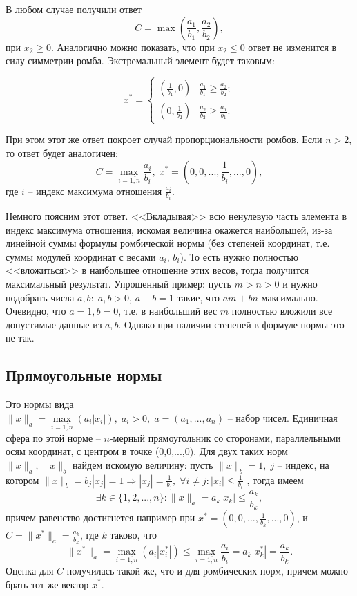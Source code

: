 \documentclass{article}
\begin{document}
В любом случае получили ответ
$$ C = \max\left(\frac{a_1}{b_1}, \frac{a_2}{b_2}\right), $$
при $x_2 \geq 0$. Аналогично можно показать, что при $x_2 \leq 0$ ответ не изменится в силу симметрии ромба. Экстремальный элемент будет таковым:

\begin{equation*} x^* = 
	\begin{cases}
		\left(\frac{1}{b_1},0\right) & \frac{a_1}{b_1} \geq \frac{a_2}{b_2}; \\
		\left(0,\frac{1}{b_2}\right) & \frac{a_2}{b_2} \geq \frac{a_1}{b_1}.
	\end{cases}
\end{equation*} 

При этом этот же ответ покроет случай пропорциональности ромбов. Если $n > 2$, то ответ будет аналогичен:
$$ C = \max\limits_{i=\overline{1,n}}\frac{a_i}{b_i}, \; x^* = \left(0,0,...,\frac{1}{b_i},...,0\right), $$
где $i$ -- индекс максимума отношения $\frac{a_i}{b_i}$.

Немного поясним этот ответ. <<Вкладывая>> всю ненулевую часть элемента в индекс максимума отношения, искомая величина окажется наибольшей, из-за линейной суммы формулы ромбической нормы (без степеней координат, т.е. суммы модулей координат с весами $a_i$, $b_i$). То есть нужно полностью <<вложиться>> в наибольшее отношение этих весов, тогда получится максимальный результат. Упрощенный пример: пусть $m > n > 0$ и нужно подобрать числа $a, b : \; a, b > 0, \, a + b = 1$ такие, что $am+bn$ максимально. Очевидно, что $a=1, b=0$, т.е. в наибольший вес $m$ полностью вложили все допустимые данные из $a, b$. Однако при наличии степеней в формуле нормы это не так.

\subsection{Прямоугольные нормы}

Это нормы вида $\|x\|_a = \max\limits_{i=\overline{1,n}}(a_i|x_i|), \; a_i > 0, \; a = (a_1,...,a_n) \text{ -- набор чисел.}$ Единичная сфера по этой норме -- $n$-мерный прямоугольник со сторонами, параллельными осям координат, с центром в точке (0,0,...,0). Для двух таких норм $\|x\|_a, \|x\|_b$ найдем искомую величину: пусть $\|x\|_b = 1, \; j$ -- индекс, на котором $ \|x\|_b = b_j|x_j| = 1 \Rightarrow |x_j| = \frac{1}{b_j}, \; \forall{i \neq j}: |x_i| \leq \frac{1}{b_i}$ , тогда имеем
$$ \exists{k \in \{1,2,...,n\}}: \|x\|_a = a_k|x_k| \leq \frac{a_k}{b_k}, $$
причем равенство достигнется например при $ x^* = \left(0,0,...,\frac{1}{b_k},...,0\right)$, и $ C = \|x^*\|_a = \frac{a_k}{b_k}$, где $k$ таково, что 
$$ \|x^*\|_a = \max\limits_{i=\overline{1,n}}(a_i|x_i^*|) \leq \max\limits_{i=\overline{1,n}}\frac{a_i}{b_i} = a_k|x_k^*| = \frac{a_k}{b_k}. $$ 
Оценка для $C$ получилась такой же, что и для ромбических норм, причем можно брать тот же вектор $x^*$. 
\end{document}
